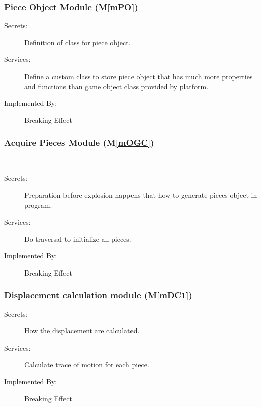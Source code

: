 \documentclass[12pt, titlepage]{article}
\newcommand{\mref}[1]{M\ref{#1}}
\begin{document}
	\subsubsection{Piece Object Module (\mref{mPO})}
	
	\begin{description}
		\item[Secrets:]Definition of class for piece object.
		\item[Services:]Define a custom class to store piece object that has much more properties and functions than game object class provided by platform. \\
		\item[Implemented By:] Breaking Effect
	\end{description}
	
	\subsubsection{Acquire Pieces Module (\mref{mOGC})}
	\\ 
	\begin{description}
		\item[Secrets:]Preparation before explosion happens that how to generate pieces object in program.
		\item[Services:]Do traversal to initialize all pieces.
		\item[Implemented By:] Breaking Effect
	\end{description}

	\subsubsection{Displacement calculation module (\mref{mDC1})}
	
	\begin{description}
		\item[Secrets:]How the displacement are calculated.\\
		\item[Services:]Calculate trace of motion for each piece.
		\item[Implemented By:] Breaking Effect
	\end{description}
	
\end{document}
